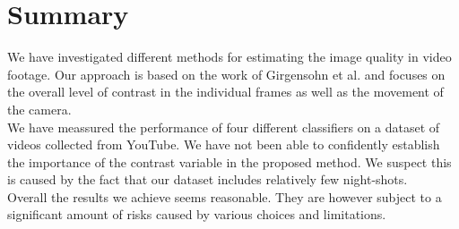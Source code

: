 \section{Summary}
%
We have investigated different methods for estimating the image quality in video footage. Our approach is based on the work of Girgensohn et al.\cite{Girgensohn:2000:SAH:354401.354415} and focuses on the overall level of contrast in the individual frames as well as the movement of the camera.\\
We have meassured the performance of four different classifiers on a dataset of videos collected from YouTube. We have not been able to confidently establish the importance of the contrast variable in the proposed method. We suspect this is caused by the fact that our dataset includes relatively few night-shots.\\
Overall the results we achieve seems reasonable. They are however subject to a significant amount of risks caused by various choices and limitations.
